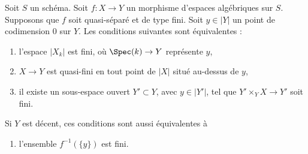 \begin{lemma}
\label{lemma-generically-finite}
Soit $S$ un schéma. Soit $f : X \to Y$ un morphisme d'espaces algébriques
sur $S$. Supposons que $f$ soit quasi-séparé et de type fini.
Soit $y \in |Y|$ un point de codimension $0$ sur $Y$.
Les conditions suivantes sont équivalentes :
\begin{enumerate}
\item l'espace $|X_k|$ est fini, où $\Spec(k) \to Y$ représente $y$,
\item $X \to Y$ est quasi-fini en tout point de $|X|$ situé au-dessus de $y$,
\item il existe un sous-espace ouvert $Y' \subset Y$, avec $y \in |Y'|$,
tel que $Y' \times_Y X \to Y'$ soit fini.
\end{enumerate}
Si $Y$ est décent, ces conditions sont aussi équivalentes à
\begin{enumerate}
\item[(4)] l'ensemble $f^{-1}(\{y\})$ est fini.
\end{enumerate}
\end{lemma}

